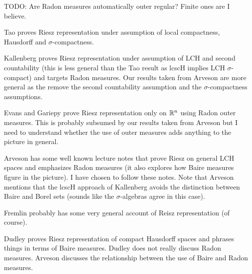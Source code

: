 TODO: Are Radon measures automatically outer regular?  Finite ones are
I believe.

Tao proves Riesz representation under assumption of local compactness, Hausdorff
and $\sigma$-compactness.

Kallenberg proves Riesz representation under assumption of LCH and
second countability (this is less general than the Tao
result as lcscH implies LCH $\sigma$-compact)
and targets Radon measures.  Our results taken from Arveson are more
general as the remove the second countability assumption and the $\sigma$-compactness
assumptions.

Evans and Gariepy prove Riesz representation only on $\mathbb{R}^n$ using
Radon outer measures.  This is probably subsumed by our results taken
from Arveson but I need to understand whether the use of outer
measures adds anything to the picture in general.

Arveson has some well known lecture notes that prove Riesz on general
LCH spaces
and emphasizes Radon measures (it also explores how Baire measures figure in the
picture).  I have chosen to follow these notes.  Note that Arveson
mentions that the lcscH approach of Kallenberg avoids the distinction
between Baire and Borel sets (sounds like the $\sigma$-algebras agree
in this case).

Fremlin probably has some very general account of Reisz representation
(of course).

Dudley proves Riesz representation of compact Hausdorff spaces and
phrases things in terms of Baire measures.  Dudley does not really
discuss Radon measures.  Arveson discusses the relationship between
the use of Baire and Radon measures.

